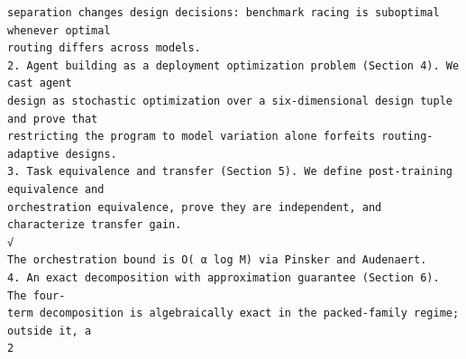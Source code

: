 \documentclass[11pt]{article}
\begin{document}
\begin{verbatim}
separation changes design decisions: benchmark racing is suboptimal whenever optimal
routing differs across models.
2. Agent building as a deployment optimization problem (Section 4). We cast agent
design as stochastic optimization over a six-dimensional design tuple and prove that
restricting the program to model variation alone forfeits routing-adaptive designs.
3. Task equivalence and transfer (Section 5). We define post-training equivalence and
orchestration equivalence, prove they are independent, and characterize transfer gain.
√
The orchestration bound is O( α log M) via Pinsker and Audenaert.
4. An exact decomposition with approximation guarantee (Section 6). The four-
term decomposition is algebraically exact in the packed-family regime; outside it, a
2
\end{verbatim}

\clearpage
\end{document}
